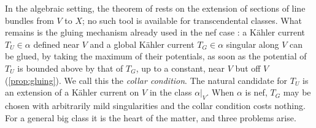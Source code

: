 \documentclass[11pt,a4paper]{amsart}
\theoremstyle{definition}
\begin{document}
In the algebraic setting, the theorem of \cite{ELMNP09} rests on the
extension of sections of line bundles from $V$ to $X$; no such tool is
available for transcendental classes. What remains is the gluing
mechanism already used in the nef case \cite{CT15}: a K\"ahler current
$T_U\in\alpha$ defined near $V$ and a global K\"ahler current
$T_G\in\alpha$ singular along $V$ can be glued, by taking the maximum of
their potentials, as soon as the potential of $T_U$ is bounded above by
that of $T_G$, up to a constant, near $V$ but off $V$
(\cref{prop:gluing}). We call this the \emph{collar condition}. The
natural candidate for $T_U$ is an extension of a K\"ahler current on $V$
in the class $\alpha|_V$. When $\alpha$ is nef, $T_G$ may be chosen with
arbitrarily mild singularities and the collar condition costs nothing.
For a general big class it is the heart of the matter, and three
problems arise.
\end{document}
